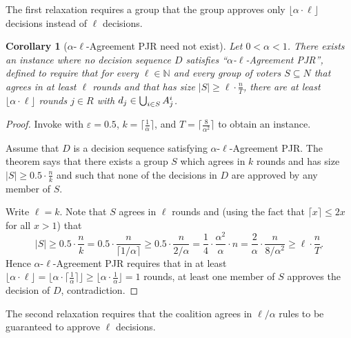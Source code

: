 \documentclass[10pt]{scrartcl}
\theoremstyle{plain}
\newtheorem{corollary}[theorem]{Corollary}
\theoremstyle{definition}
\renewcommand*{\le}{\leqslant}
\renewcommand*{\ge}{\geqslant}
\renewcommand*{\geq}{\geqslant}
\renewcommand{\epsilon}{\varepsilon}
\begin{document}
The first relaxation requires a group that the group approves only $\lfloor \alpha \cdot \ell \rfloor$ decisions instead of $\ell$ decisions.

\begin{corollary}[$\alpha$-$\ell$-Agreement PJR need not exist]
	Let $0 < \alpha < 1$. There exists an instance where no decision sequence $D$ satisfies  ``\emph{$\alpha$-$\ell$-Agreement PJR}'',
	defined to require that for every $\ell \in \mathbb N$ and every group of voters $S \subseteq N$ that agrees in at least $\ell$ rounds and that has size $|S| \geq \ell \cdot \frac{n}{T}$, there are at least $\lfloor \alpha \cdot \ell \rfloor$ rounds $j \in R$ with $d_j \in \bigcup_{i \in S} \smash{A_j^i}$.
\end{corollary}
\begin{proof}
	Invoke  with $\epsilon=0.5$, $k = \lceil \frac{1}{\alpha} \rceil$, and $T = \lceil \frac{8}{\alpha^2} \rceil$ to obtain an instance.
	
	Assume that $D$ is a decision sequence satisfying $\alpha$-$\ell$-Agreement PJR. The theorem says that there exists a group $S$ which agrees in $k$ rounds and has size $|S| \ge 0.5 \cdot \frac{n}{k}$ and such that none of the decisions in $D$ are approved by any member of $S$.
	
	Write $\ell = k$. Note that $S$ agrees in $\ell$ rounds and (using the fact that $\lceil x \rceil \le 2x$ for all $x > 1$) that
	\[
	|S| 
	\ge 0.5 \cdot \frac{n}{k} 
	= 0.5 \cdot \frac{n}{\lceil 1/\alpha \rceil} 
	\ge 0.5 \cdot \frac{n}{2/\alpha} 
	= \frac{1}{4} \cdot \frac{\alpha^2}{\alpha} \cdot n
	= \frac{2}{\alpha} \cdot \frac{n}{8/\alpha^2}
	\ge \ell \cdot \frac{n}{T}.
	\]
	Hence $\alpha$-$\ell$-Agreement PJR requires that in at least $\lfloor \alpha \cdot \ell \rfloor = \lfloor \alpha \cdot \lceil \frac{1}{\alpha} \rceil \rfloor \ge \lfloor \alpha \cdot \frac{1}{\alpha} \rfloor = 1$ rounds, at least one member of $S$ approves the decision of $D$, contradiction.
\end{proof}



The second relaxation requires that the coalition agrees in $\ell/\alpha$ rules to be guaranteed to approve $\ell$ decisions.
\end{document}
